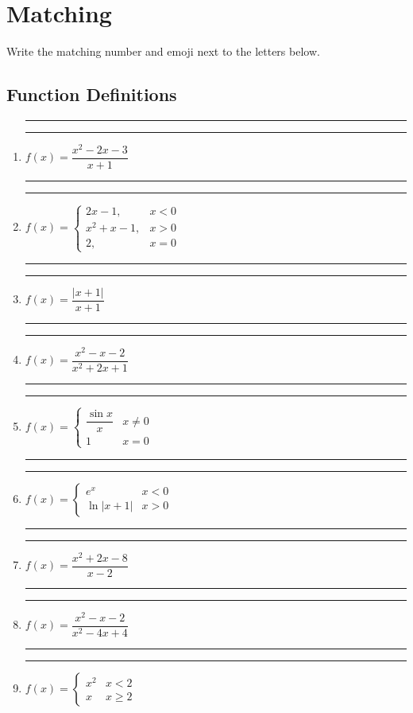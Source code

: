 \documentclass[12pt
]{article}
\author{}
\date{}
\begin{document}
\section{Matching}\label{matching}

Write the matching number and emoji next to the letters below.

\subsection{Function Definitions}
\begin{enumerate}
\def\labelenumi{\Alph{enumi}.}
\item \rule{0.25in}{0.5pt} \rule{0.5in}{0.5pt}
  \(f(x)=\dfrac{x^{2}-2 x-3}{x+1}\)
\item  \rule{0.25in}{0.5pt} \rule{0.5in}{0.5pt}
  \(f(x)=\left\{\begin{array}{cc}2 x-1, & x<0 \\ x^{2}+x-1, & x>0 \\ 2, & x=0\end{array}\right.\)
\item  \rule{0.25in}{0.5pt} \rule{0.5in}{0.5pt}
  \(f(x)=\dfrac{|x+1|}{x+1}\)
\item  \rule{0.25in}{0.5pt} \rule{0.5in}{0.5pt}
  \(f(x)=\dfrac{x^{2}-x-2}{x^{2}+2 x+1}\)
\item  \rule{0.25in}{0.5pt} \rule{0.5in}{0.5pt}
  \(f(x)=\left\{\begin{array}{cc}\dfrac{\sin x}{x} & x \neq 0 \\ 1 & x=0\end{array}\right.\)
\item  \rule{0.25in}{0.5pt} \rule{0.5in}{0.5pt}
  \(f(x)=\left\{\begin{array}{cl}e^{x} & x<0 \\ \ln |x+1| & x>0\end{array}\right.\)
\item  \rule{0.25in}{0.5pt} \rule{0.5in}{0.5pt}
  \(f(x)=\dfrac{x^{2}+2 x-8}{x-2}\)
\item  \rule{0.25in}{0.5pt} \rule{0.5in}{0.5pt}
  \(f(x)=\dfrac{x^{2}-x-2}{x^{2}-4 x+4}\)
\item  \rule{0.25in}{0.5pt} \rule{0.5in}{0.5pt}
  \(f(x)=\left\{\begin{array}{cc}x^{2} & x<2 \\ x & x \geq 2\end{array}\right.\)
\end{enumerate}
\end{document}
